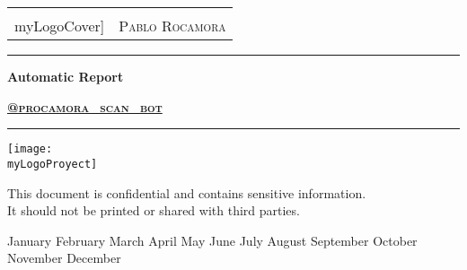 \documentclass[a4paper]{article}
\makeatletter
\newcommand{\myLogoCover}{\VAR{icon1}}
\newcommand{\myLogoProyect}{\VAR{icon2}}
\newcommand{\myTitle}{Automatic Report}
\newcommand{\mySubtitle}{\href{https://telegram.me/procamora_scan_bot}{@procamora\_scan\_bot}}
\newcommand{\myName}{Pablo Rocamora}
\newcommand{\myMonth}{%
  \ifcase\month   %
    \or January   %
    \or February  %
    \or March     %
    \or April     %
    \or May       %
    \or June      %
    \or July      %
    \or August    %
    \or September %
    \or October   %
    \or November  %
    \or December  %
  \fi}
\newcommand{\myDate}{\number\day\space \myMonth \number\year}
\makeatother
\begin{document}
\cfoot{\thepage}
\begin{titlepage}
	\centering
    
    \begin{tabular}{ll}
    \raisebox{-.4\height}{\texttt{[image: \\myLogoCover]}} & { \hspace{8cm} \scshape\LARGE {\myName}} \\
	\end{tabular}
    
    \par\vspace{1cm}
	\vfill
    
    {\rule{\linewidth}{0.5mm}\vspace{0.5cm}} %
    
    {\Huge\bfseries\textcolor{greenPortada}{\myTitle}}
	\par\vspace{0.5cm}
	{\scshape\LARGE \textbf{\mySubtitle}}

    {\vspace{0.5cm}\rule{\linewidth}{0.5mm}} %
    
	\vfill\vfill
	\texttt{[image: \\myLogoProyect]}\par\vspace{1cm}
	\vfill\vfill
    
	\begin{tcolorbox}[colback=red!5!white,colframe=red!75!black]
		\centering
		This document is confidential and contains sensitive information.
		\\
		It should not be printed or shared with third parties.
	\end{tcolorbox}
    
	\vfill\vfill
	{\large \myDate \par}
	\vfill
\end{titlepage}

	



\clearpage
\clearpage
\end{document}
